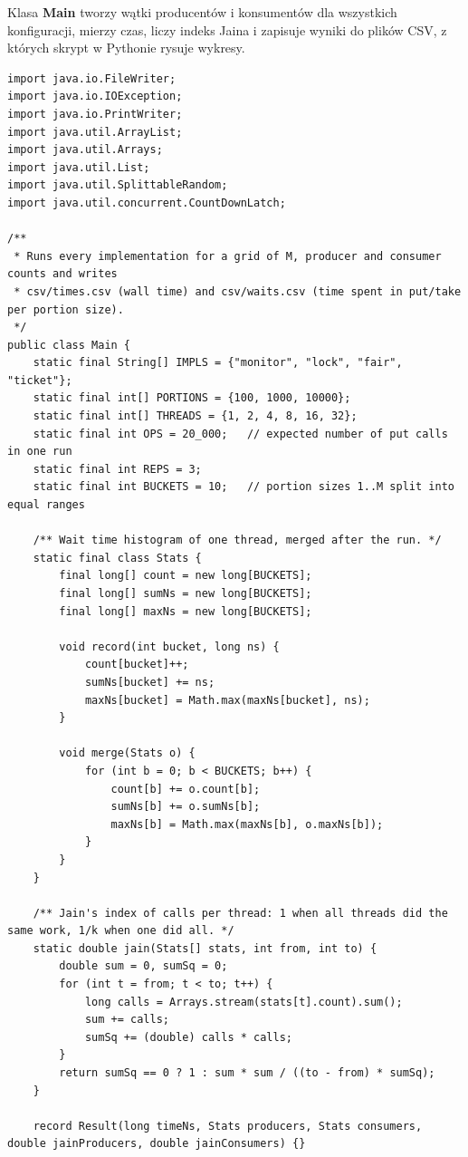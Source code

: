 \documentclass[11pt,a4paper]{article}
\begin{document}
Klasa \textbf{Main} tworzy wątki producentów i konsumentów dla wszystkich konfiguracji, mierzy czas, liczy indeks Jaina i zapisuje wyniki do plików CSV, z których skrypt w Pythonie rysuje wykresy.

\begin{lstlisting}[caption={Klasa \textbf{Main} (\texttt{src/Main.java})}]
import java.io.FileWriter;
import java.io.IOException;
import java.io.PrintWriter;
import java.util.ArrayList;
import java.util.Arrays;
import java.util.List;
import java.util.SplittableRandom;
import java.util.concurrent.CountDownLatch;

/**
 * Runs every implementation for a grid of M, producer and consumer counts and writes
 * csv/times.csv (wall time) and csv/waits.csv (time spent in put/take per portion size).
 */
public class Main {
    static final String[] IMPLS = {"monitor", "lock", "fair", "ticket"};
    static final int[] PORTIONS = {100, 1000, 10000};
    static final int[] THREADS = {1, 2, 4, 8, 16, 32};
    static final int OPS = 20_000;   // expected number of put calls in one run
    static final int REPS = 3;
    static final int BUCKETS = 10;   // portion sizes 1..M split into equal ranges

    /** Wait time histogram of one thread, merged after the run. */
    static final class Stats {
        final long[] count = new long[BUCKETS];
        final long[] sumNs = new long[BUCKETS];
        final long[] maxNs = new long[BUCKETS];

        void record(int bucket, long ns) {
            count[bucket]++;
            sumNs[bucket] += ns;
            maxNs[bucket] = Math.max(maxNs[bucket], ns);
        }

        void merge(Stats o) {
            for (int b = 0; b < BUCKETS; b++) {
                count[b] += o.count[b];
                sumNs[b] += o.sumNs[b];
                maxNs[b] = Math.max(maxNs[b], o.maxNs[b]);
            }
        }
    }

    /** Jain's index of calls per thread: 1 when all threads did the same work, 1/k when one did all. */
    static double jain(Stats[] stats, int from, int to) {
        double sum = 0, sumSq = 0;
        for (int t = from; t < to; t++) {
            long calls = Arrays.stream(stats[t].count).sum();
            sum += calls;
            sumSq += (double) calls * calls;
        }
        return sumSq == 0 ? 1 : sum * sum / ((to - from) * sumSq);
    }

    record Result(long timeNs, Stats producers, Stats consumers, double jainProducers, double jainConsumers) {}


\end{lstlisting}
\end{document}
